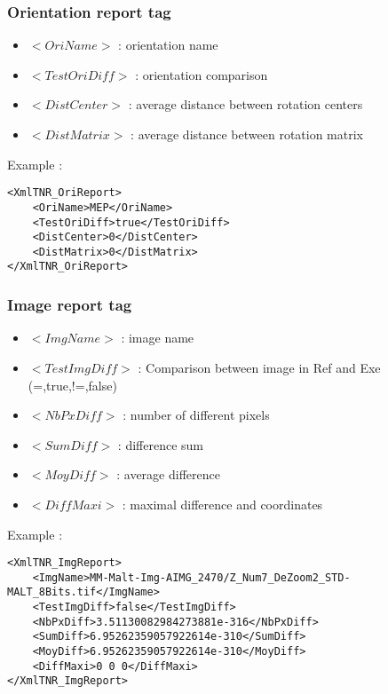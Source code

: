 \documentclass[a4paper]{book}
\begin{document}
\subsubsection{Orientation report tag}
\begin{itemize}
\item $<OriName>$ : orientation name
\item $<TestOriDiff>$ : orientation comparison
\item $<DistCenter>$ : average distance between rotation centers
\item $<DistMatrix>$ : average distance between rotation matrix\\
\end{itemize}

Example : 
\begin{lstlisting}
<XmlTNR_OriReport>
	<OriName>MEP</OriName>
	<TestOriDiff>true</TestOriDiff>
	<DistCenter>0</DistCenter>
	<DistMatrix>0</DistMatrix>
</XmlTNR_OriReport>
\end{lstlisting}

\subsubsection{Image report tag}
\begin{itemize}
\item $<ImgName>$ : image name
\item $<TestImgDiff>$ : Comparison between image in Ref and Exe (=,true,!=,false)
\item $<NbPxDiff>$ : number of different pixels
\item $<SumDiff>$ : difference sum
\item $<MoyDiff>$ : average difference
\item $<DiffMaxi>$ : maximal difference and coordinates
\end{itemize}

Example : 
\begin{lstlisting}
<XmlTNR_ImgReport>
	<ImgName>MM-Malt-Img-AIMG_2470/Z_Num7_DeZoom2_STD-MALT_8Bits.tif</ImgName>
	<TestImgDiff>false</TestImgDiff>
	<NbPxDiff>3.51130082984273881e-316</NbPxDiff>
	<SumDiff>6.95262359057922614e-310</SumDiff>
	<MoyDiff>6.95262359057922614e-310</MoyDiff>
	<DiffMaxi>0 0 0</DiffMaxi>
</XmlTNR_ImgReport>
\end{lstlisting}
\end{document}
